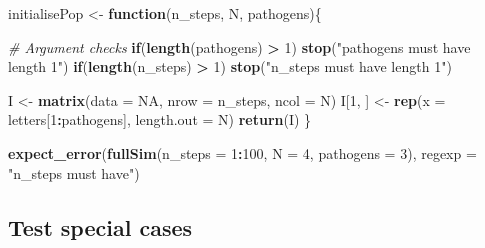\documentclass[]{elsarticle} %
\newenvironment{Shaded}{\begin{snugshade}}{\end{snugshade}}
\newcommand{\CommentTok}[1]{\textcolor[rgb]{0.56,0.35,0.01}{\textit{#1}}}
\newcommand{\ControlFlowTok}[1]{\textcolor[rgb]{0.13,0.29,0.53}{\textbf{#1}}}
\newcommand{\DataTypeTok}[1]{\textcolor[rgb]{0.13,0.29,0.53}{#1}}
\newcommand{\DecValTok}[1]{\textcolor[rgb]{0.00,0.00,0.81}{#1}}
\newcommand{\KeywordTok}[1]{\textcolor[rgb]{0.13,0.29,0.53}{\textbf{#1}}}
\newcommand{\NormalTok}[1]{#1}
\newcommand{\OperatorTok}[1]{\textcolor[rgb]{0.81,0.36,0.00}{\textbf{#1}}}
\newcommand{\OtherTok}[1]{\textcolor[rgb]{0.56,0.35,0.01}{#1}}
\newcommand{\StringTok}[1]{\textcolor[rgb]{0.31,0.60,0.02}{#1}}
\begin{document}
\begin{Shaded}
\begin{Highlighting}[]
\NormalTok{initialisePop <-}\StringTok{ }\ControlFlowTok{function}\NormalTok{(n_steps, N, pathogens)\{}
  
  \CommentTok{# Argument checks}
  \ControlFlowTok{if}\NormalTok{(}\KeywordTok{length}\NormalTok{(pathogens) }\OperatorTok{>}\StringTok{ }\DecValTok{1}\NormalTok{) }\KeywordTok{stop}\NormalTok{(}\StringTok{"pathogens must have length 1"}\NormalTok{)}
  \ControlFlowTok{if}\NormalTok{(}\KeywordTok{length}\NormalTok{(n_steps) }\OperatorTok{>}\StringTok{ }\DecValTok{1}\NormalTok{) }\KeywordTok{stop}\NormalTok{(}\StringTok{"n_steps must have length 1"}\NormalTok{)}

\NormalTok{  I <-}\StringTok{ }\KeywordTok{matrix}\NormalTok{(}\DataTypeTok{data =} \OtherTok{NA}\NormalTok{, }\DataTypeTok{nrow =}\NormalTok{ n_steps, }\DataTypeTok{ncol =}\NormalTok{ N)}
\NormalTok{  I[}\DecValTok{1}\NormalTok{, ] <-}\StringTok{ }\KeywordTok{rep}\NormalTok{(}\DataTypeTok{x =}\NormalTok{ letters[}\DecValTok{1}\OperatorTok{:}\NormalTok{pathogens], }\DataTypeTok{length.out =}\NormalTok{ N)}
  \KeywordTok{return}\NormalTok{(I)}
\NormalTok{\}}

\KeywordTok{expect_error}\NormalTok{(}\KeywordTok{fullSim}\NormalTok{(}\DataTypeTok{n_steps =} \DecValTok{1}\OperatorTok{:}\DecValTok{100}\NormalTok{, }\DataTypeTok{N =} \DecValTok{4}\NormalTok{, }\DataTypeTok{pathogens =} \DecValTok{3}\NormalTok{), }
             \DataTypeTok{regexp =} \StringTok{"n_steps must have"}\NormalTok{)}
\end{Highlighting}
\end{Shaded}

\hypertarget{corners}{%
\subsection*{Test special cases}\label{corners}}
\end{document}
